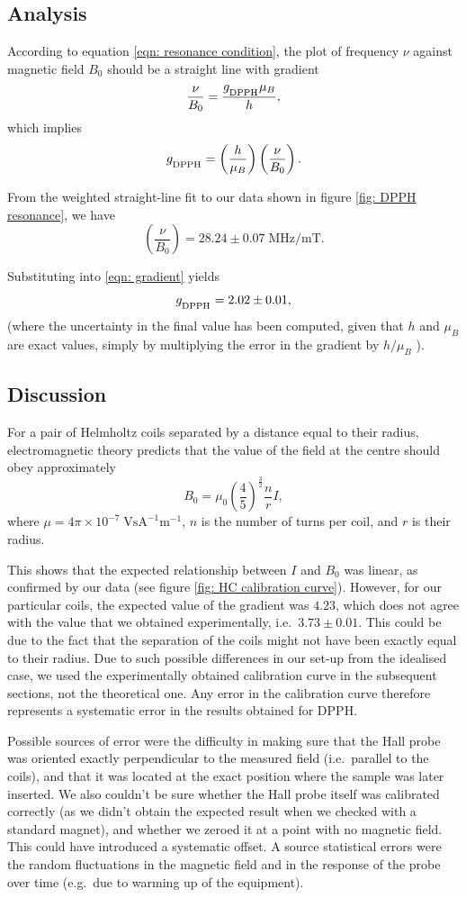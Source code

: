 \documentclass[a4paper]{jpconf}
\numberwithin{equation}{section}
\begin{document}
\subsection{Analysis}
According to equation \eqref{eqn: resonance condition}, the plot of frequency $\nu$ against magnetic field $B_0$ should be a straight line with gradient 
\[
	\frac{\nu}{B_0} = \frac{g_{\textsubscript{DPPH}} \mu_B}{h},
\]
which implies
\begin{equation} \label{eqn: gradient}
	g_{\textsubscript{DPPH}} = \left(\frac{h}{\mu_B}\right) \left(\frac{\nu}{B_0}\right). 
\end{equation}
	
From the weighted straight-line fit to our data shown in figure \ref{fig: DPPH resonance}, we have
\[
	\left(\frac{\nu}{B_0}\right) = 28.24 \pm 0.07 \; \si{\mega\hertz\per\milli\tesla}.
\]

Substituting into \eqref{eqn: gradient} yields 
\[
	g_{\textsubscript{DPPH}} = 2.02 \pm 0.01,
\] 
(where the uncertainty in the final value has been computed, given that $h$ and $\mu_B$ are exact values, simply by multiplying the error in the gradient by $h / \mu_B$ ).

\subsection{Discussion}
For a pair of Helmholtz coils separated by a distance equal to their radius, electromagnetic theory predicts that the value of the field at the centre should obey approximately
\[
	B_0 = \mu_0 \left(\frac45\right)^{\tfrac32} \frac{n}{r} I,
\]
where $\mu = 4\pi\times10^{-7} \; \si{\volt\s\ampere\tothe{-1}\meter\tothe{-1}}$, $n$ is the number of turns per coil, and $r$ is their radius.

This shows that the expected relationship between $I$ and $B_0$ was linear, as confirmed by our data (see figure \ref{fig: HC calibration curve}).
However, for our particular coils, the expected value of the gradient was $4.23$, which does not agree with the value that we obtained experimentally, i.e.\ $3.73 \pm 0.01$. This could be due to the fact that the separation of the coils might not have been exactly equal to their radius. Due to such possible differences in our set-up from the idealised case, we used the experimentally obtained calibration curve in the subsequent sections, not the theoretical one. Any error in the calibration curve therefore represents a systematic error in the results obtained for DPPH. 

Possible sources of error were the difficulty in making sure that the Hall probe was oriented exactly perpendicular to the measured field (i.e.\ parallel to the coils), and that it was located at the exact position where the sample was later inserted. We also couldn't be sure whether the Hall probe itself was calibrated correctly (as we didn't obtain the expected result when we checked with a standard magnet), and whether we zeroed it at a point with no magnetic field. This could have introduced a systematic offset. A source statistical errors were the random fluctuations in the magnetic field and in the response of the probe over time (e.g.\ due to warming up of the equipment).
\end{document}
